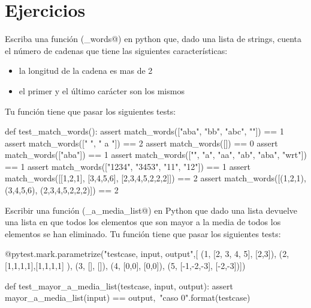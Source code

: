 \section*{Ejercicios}

\begin{exercise}
Escriba una función (\verb@match_words@) en python que, dado una lista de strings, cuenta el número de cadenas que tiene las siguientes características:
\begin{itemize}
\item la longitud de la cadena es mas de 2
\item el primer y el último carácter son los mismos
\end{itemize}

Tu función tiene que pasar los siguientes tests:\\

\begin{small}
\begin{python}
def test_match_words():
    assert match_words(["aba", "bb", "abc", ""]) == 1
    assert match_words(["   ", " a "]) == 2
    assert match_words([]) == 0
    assert match_words(["aba"]) == 1
    assert match_words(["", "a", "aa", "ab", "aba", "wrt"]) == 1
    assert match_words(["1234", "3453", "11", "12"]) == 1
    assert match_words([[1,2,1], [3,4,5,6], [2,3,4,5,2,2,2]]) == 2
    assert match_words([(1,2,1), (3,4,5,6), (2,3,4,5,2,2,2)]) == 2  
\end{python}
\end{small}
\end{exercise}

\begin{exercise} 
Escribir una función (\verb@mayor_a_media_list@) en Python que dado una lista devuelve una lista en que todos los elementos que son mayor a la media de todos los elementos se han eliminado. Tu función tiene que pasar los siguientes tests:

\begin{small}
\begin{python}
@pytest.mark.parametrize("testcase, input, output",[
(1, [2, 3, 4, 5], [2,3]),   
(2, [1,1,1,1],[1,1,1,1] ),              
(3, [], []),
(4, [0,0], [0,0]),
(5, [-1,-2,-3], [-2,-3])])              

def test_mayor_a_media_list(testcase, input, output):
    assert mayor_a_media_list(input) == output,\
           "caso {0}".format(testcase)
\end{python}
\end{small}

\end{exercise}

